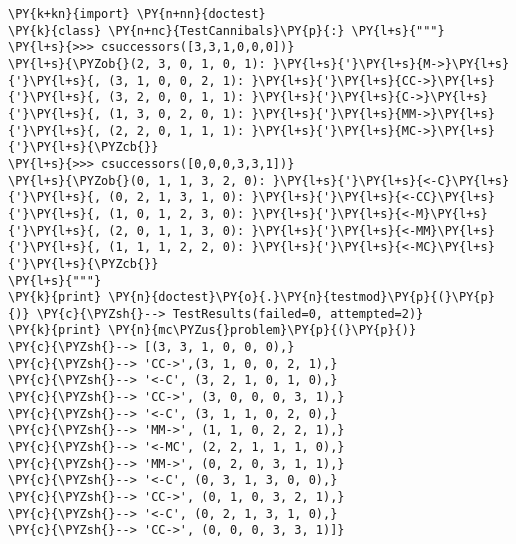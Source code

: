 \begin{Verbatim}[commandchars=\\\{\}]
\PY{k+kn}{import} \PY{n+nn}{doctest}
\PY{k}{class} \PY{n+nc}{TestCannibals}\PY{p}{:} \PY{l+s}{"""}
\PY{l+s}{>>> csuccessors([3,3,1,0,0,0])}
\PY{l+s}{\PYZob{}(2, 3, 0, 1, 0, 1): }\PY{l+s}{'}\PY{l+s}{M->}\PY{l+s}{'}\PY{l+s}{, (3, 1, 0, 0, 2, 1): }\PY{l+s}{'}\PY{l+s}{CC->}\PY{l+s}{'}\PY{l+s}{, (3, 2, 0, 0, 1, 1): }\PY{l+s}{'}\PY{l+s}{C->}\PY{l+s}{'}\PY{l+s}{, (1, 3, 0, 2, 0, 1): }\PY{l+s}{'}\PY{l+s}{MM->}\PY{l+s}{'}\PY{l+s}{, (2, 2, 0, 1, 1, 1): }\PY{l+s}{'}\PY{l+s}{MC->}\PY{l+s}{'}\PY{l+s}{\PYZcb{}}
\PY{l+s}{>>> csuccessors([0,0,0,3,3,1])}
\PY{l+s}{\PYZob{}(0, 1, 1, 3, 2, 0): }\PY{l+s}{'}\PY{l+s}{<-C}\PY{l+s}{'}\PY{l+s}{, (0, 2, 1, 3, 1, 0): }\PY{l+s}{'}\PY{l+s}{<-CC}\PY{l+s}{'}\PY{l+s}{, (1, 0, 1, 2, 3, 0): }\PY{l+s}{'}\PY{l+s}{<-M}\PY{l+s}{'}\PY{l+s}{, (2, 0, 1, 1, 3, 0): }\PY{l+s}{'}\PY{l+s}{<-MM}\PY{l+s}{'}\PY{l+s}{, (1, 1, 1, 2, 2, 0): }\PY{l+s}{'}\PY{l+s}{<-MC}\PY{l+s}{'}\PY{l+s}{\PYZcb{}}
\PY{l+s}{"""}
\PY{k}{print} \PY{n}{doctest}\PY{o}{.}\PY{n}{testmod}\PY{p}{(}\PY{p}{)} \PY{c}{\PYZsh{}--> TestResults(failed=0, attempted=2)}
\PY{k}{print} \PY{n}{mc\PYZus{}problem}\PY{p}{(}\PY{p}{)}
\PY{c}{\PYZsh{}--> [(3, 3, 1, 0, 0, 0),}
\PY{c}{\PYZsh{}--> 'CC->',(3, 1, 0, 0, 2, 1),}
\PY{c}{\PYZsh{}--> '<-C', (3, 2, 1, 0, 1, 0),}
\PY{c}{\PYZsh{}--> 'CC->', (3, 0, 0, 0, 3, 1),}
\PY{c}{\PYZsh{}--> '<-C', (3, 1, 1, 0, 2, 0),}
\PY{c}{\PYZsh{}--> 'MM->', (1, 1, 0, 2, 2, 1),}
\PY{c}{\PYZsh{}--> '<-MC', (2, 2, 1, 1, 1, 0),}
\PY{c}{\PYZsh{}--> 'MM->', (0, 2, 0, 3, 1, 1),}
\PY{c}{\PYZsh{}--> '<-C', (0, 3, 1, 3, 0, 0),}
\PY{c}{\PYZsh{}--> 'CC->', (0, 1, 0, 3, 2, 1),}
\PY{c}{\PYZsh{}--> '<-C', (0, 2, 1, 3, 1, 0),}
\PY{c}{\PYZsh{}--> 'CC->', (0, 0, 0, 3, 3, 1)]}
\end{Verbatim}
